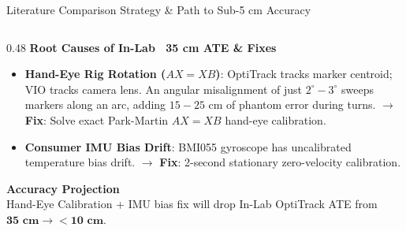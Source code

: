 \documentclass[aspectratio=169, 10pt]{beamer}
\begin{document}
\begin{frame}{Literature Comparison Strategy \& Path to Sub-5 cm Accuracy}
\begin{columns}[T]
    \begin{column}{0.48\textwidth}
      {\normalsize \textbf{\textcolor{NavyBlue}{Root Causes of In-Lab ~35 cm ATE \& Fixes}}}
      \vspace{0.1cm}
      \begin{itemize}
        \setlength{\itemsep}{3pt}
        \item \textbf{Hand-Eye Rig Rotation ($AX = XB$)}:
          OptiTrack tracks marker centroid; VIO tracks camera lens. An angular misalignment of just $2^\circ - 3^\circ$ sweeps markers along an arc, adding $15 - 25\text{ cm}$ of phantom error during turns.
          $\rightarrow$ \textbf{Fix}: Solve exact Park-Martin $AX = XB$ hand-eye calibration.
        \item \textbf{Consumer IMU Bias Drift}:
          BMI055 gyroscope has uncalibrated temperature bias drift.
          $\rightarrow$ \textbf{Fix}: 2-second stationary zero-velocity calibration.
      \end{itemize}
      \vspace{0.15cm}

      {\small \textbf{\textcolor{EmeraldGreen}{Accuracy Projection}}}\\
      Hand-Eye Calibration + IMU bias fix will drop In-Lab OptiTrack ATE from $\mathbf{35\text{ cm} \rightarrow < 10\text{ cm}}$.
    \end{column}
  \end{columns}
\end{frame}
\end{document}
